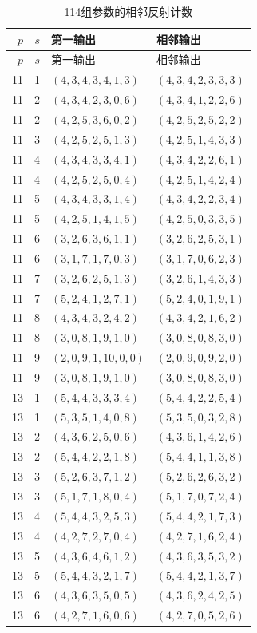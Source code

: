 \begin{longtable}{rrll}
\caption{114组参数的相邻反射计数}\label{tab:root-data}\\
\toprule $p$&$s$&第一输出&相邻输出\\\midrule\endfirsthead
\toprule $p$&$s$&第一输出&相邻输出\\\midrule\endhead
11&1&$(4,3,4,3,4,1,3)$&$(4,3,4,2,3,3,3)$\\
11&2&$(4,3,4,2,3,0,6)$&$(4,3,4,1,2,2,6)$\\
11&2&$(4,2,5,3,6,0,2)$&$(4,2,5,2,5,2,2)$\\
11&3&$(4,2,5,2,5,1,3)$&$(4,2,5,1,4,3,3)$\\
11&4&$(4,3,4,3,3,4,1)$&$(4,3,4,2,2,6,1)$\\
11&4&$(4,2,5,2,5,0,4)$&$(4,2,5,1,4,2,4)$\\
11&5&$(4,3,4,3,3,1,4)$&$(4,3,4,2,2,3,4)$\\
11&5&$(4,2,5,1,4,1,5)$&$(4,2,5,0,3,3,5)$\\
11&6&$(3,2,6,3,6,1,1)$&$(3,2,6,2,5,3,1)$\\
11&6&$(3,1,7,1,7,0,3)$&$(3,1,7,0,6,2,3)$\\
11&7&$(3,2,6,2,5,1,3)$&$(3,2,6,1,4,3,3)$\\
11&7&$(5,2,4,1,2,7,1)$&$(5,2,4,0,1,9,1)$\\
11&8&$(4,3,4,3,2,4,2)$&$(4,3,4,2,1,6,2)$\\
11&8&$(3,0,8,1,9,1,0)$&$(3,0,8,0,8,3,0)$\\
11&9&$(2,0,9,1,10,0,0)$&$(2,0,9,0,9,2,0)$\\
11&9&$(3,0,8,1,9,1,0)$&$(3,0,8,0,8,3,0)$\\
13&1&$(5,4,4,3,3,3,4)$&$(5,4,4,2,2,5,4)$\\
13&1&$(5,3,5,1,4,0,8)$&$(5,3,5,0,3,2,8)$\\
13&2&$(4,3,6,2,5,0,6)$&$(4,3,6,1,4,2,6)$\\
13&2&$(5,4,4,2,2,1,8)$&$(5,4,4,1,1,3,8)$\\
13&3&$(5,2,6,3,7,1,2)$&$(5,2,6,2,6,3,2)$\\
13&3&$(5,1,7,1,8,0,4)$&$(5,1,7,0,7,2,4)$\\
13&4&$(5,4,4,3,2,5,3)$&$(5,4,4,2,1,7,3)$\\
13&4&$(4,2,7,2,7,0,4)$&$(4,2,7,1,6,2,4)$\\
13&5&$(4,3,6,4,6,1,2)$&$(4,3,6,3,5,3,2)$\\
13&5&$(5,4,4,3,2,1,7)$&$(5,4,4,2,1,3,7)$\\
13&6&$(4,3,6,3,5,0,5)$&$(4,3,6,2,4,2,5)$\\
13&6&$(4,2,7,1,6,0,6)$&$(4,2,7,0,5,2,6)$\\

\end{longtable}
